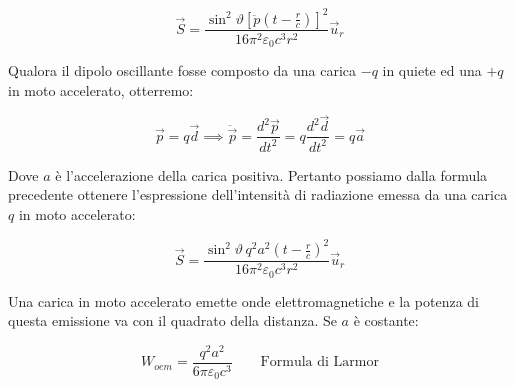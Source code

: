 \[
	\vec{S} = \frac{\sin^2 \vartheta \left[ \ddot{p}\left( t-\frac{r}{c} \right)   \right]^2}{16\pi^2 \varepsilon_0 c^3 r^2} \vec{u}_r
\]

Qualora il dipolo oscillante fosse composto da una carica $-q$ in quiete ed una $+q$ in moto accelerato, otterremo:

\[
	\vec{p} = q\vec{d} \implies \ddot{\vec{p}}=\frac{d^2 \vec{p}}{dt^2} = q\frac{d^2 \vec{d}}{dt^2} = q\vec{a}
\]

Dove $a$ è l'accelerazione della carica positiva. Pertanto possiamo dalla formula precedente ottenere l'espressione dell'intensità di radiazione emessa da una carica $q$ in moto accelerato:

\[
	\vec{S} = \frac{\sin^2 \vartheta\,  q^2 a^2 \left( t-\frac{r}{c} \right) ^2}{16\pi^2 \varepsilon_0 c^3 r^2} \vec{u}_r
\]

Una carica in moto accelerato emette onde elettromagnetiche e la potenza di questa emissione va con il quadrato della distanza. Se $ a $ è costante:

\[
	W_{oem} = \frac{q^2 a^2}{6\pi \varepsilon_0 c^3} \qquad \text{Formula di Larmor}
\]